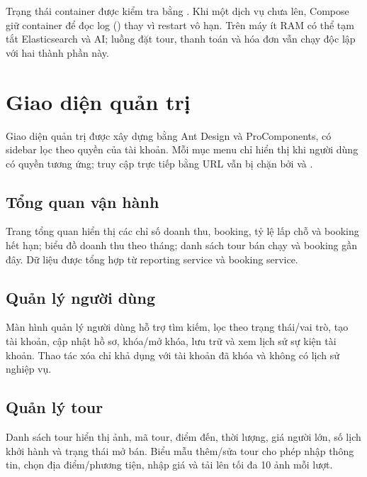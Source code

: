 \begin{notebox}
Trạng thái container được kiểm tra bằng . Khi một dịch vụ chưa lên, Compose giữ container để đọc log () thay vì restart vô hạn. Trên máy ít RAM có thể tạm tắt Elasticsearch và AI; luồng đặt tour, thanh toán và hóa đơn vẫn chạy độc lập với hai thành phần này.
\end{notebox}

\section{Giao diện quản trị}
\label{sec:giao-dien-quan-tri}

Giao diện quản trị được xây dựng bằng Ant Design và ProComponents, có sidebar lọc theo quyền của tài khoản. Mỗi mục menu chỉ hiển thị khi người dùng có quyền tương ứng; truy cập trực tiếp bằng URL vẫn bị chặn bởi  và .

\subsection{Tổng quan vận hành}

Trang tổng quan hiển thị các chỉ số doanh thu, booking, tỷ lệ lấp chỗ và booking hết hạn; biểu đồ doanh thu theo tháng; danh sách tour bán chạy và booking gần đây. Dữ liệu được tổng hợp từ reporting service và booking service.


\subsection{Quản lý người dùng}

Màn hình quản lý người dùng hỗ trợ tìm kiếm, lọc theo trạng thái/vai trò, tạo tài khoản, cập nhật hồ sơ, khóa/mở khóa, lưu trữ và xem lịch sử sự kiện tài khoản. Thao tác xóa chỉ khả dụng với tài khoản đã khóa và không có lịch sử nghiệp vụ.


\subsection{Quản lý tour}

Danh sách tour hiển thị ảnh, mã tour, điểm đến, thời lượng, giá người lớn, số lịch khởi hành và trạng thái mở bán. Biểu mẫu thêm/sửa tour cho phép nhập thông tin, chọn địa điểm/phương tiện, nhập giá và tải lên tối đa 10 ảnh mỗi lượt.

